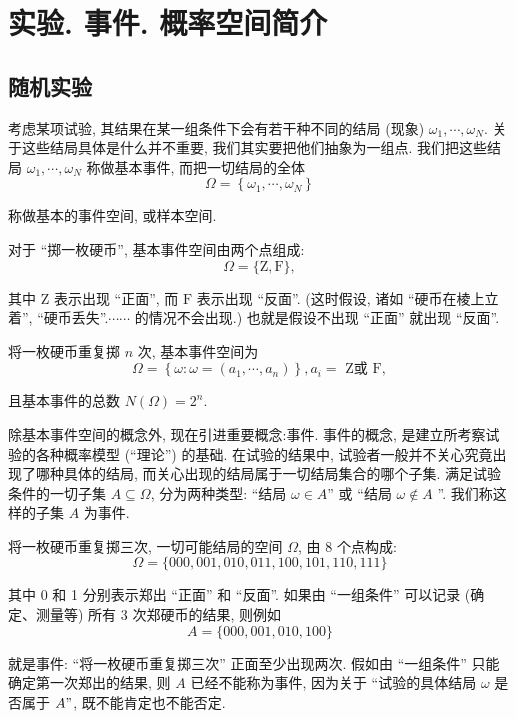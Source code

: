 \section{实验. 事件. 概率空间简介}
\subsection{随机实验}

考虑某项试验, 其结果在某一组条件下会有若干种不同的结局 (现象) $\omega_1, \cdots, \omega_N.$ 关于这些结局具体是什么并不重要, 我们其实要把他们抽象为一组点. 我们把这些结局 $\omega_1, \cdots, \omega_N$ 称做基本事件, 而把一切结局的全体
$$
\Omega=\left\{\omega_1, \cdots, \omega_N\right\}
$$

称做基本的事件空间, 或样本空间.

\begin{example}
    对于 ``掷一枚硬币'', 基本事件空间由两个点组成:
$$
\Omega=\{\mathrm{Z}, \mathrm{F}\},
$$

其中 Z 表示出现 ``正面'', 而 $\mathrm{F}$ 表示出现 ``反面''. (这时假设, 诸如 ``硬币在棱上立着'', ``硬币丢失''.$\cdots \cdots$ 的情况不会出现.) 也就是假设不出现 ``正面'' 就出现 ``反面''.

    将一枚硬币重复掷 $n$ 次, 基本事件空间为
$$
\Omega=\left\{\omega: \omega=\left(a_1, \cdots, a_n\right)\right\}, a_i=\text { Z或 } \mathrm{F},
$$

且基本事件的总数 $N(\Omega)=2^n$.
\end{example}

除基本事件空间的概念外, 现在引进重要概念:事件. 事件的概念, 是建立所考察试验的各种概率模型 (``理论'') 的基础. 在试验的结果中, 试验者一般并不关心究竟出现了哪种具体的结局, 而关心出现的结局属于一切结局集合的哪个子集. 满足试验条件的一切子集 $A \subseteq \Omega$, 分为两种类型: ``结局 $\omega \in A$'' 或 ``结局 $\omega \notin A$ ''. 我们称这样的子集 $A$ 为事件.

\begin{example}
    将一枚硬币重复掷三次, 一切可能结局的空间 $\Omega$, 由 8 个点构成:
$$
\Omega=\{000,001,010,011,100,101,110,111\}
$$

其中 0 和 1 分别表示郑出 ``正面'' 和 ``反面''. 如果由 ``一组条件'' 可以记录 (确定、测量等) 所有 3 次郑硬币的结果, 则例如
$$
A=\{000,001,010,100\}
$$

就是事件: ``将一枚硬币重复掷三次'' 正面至少出现两次. 假如由 ``一组条件'' 只能确定第一次郑出的结果, 则 $A$ 已经不能称为事件, 因为关于 ``试验的具体结局 $\omega$ 是否属于 $A "$, 既不能肯定也不能否定.
\end{example}

